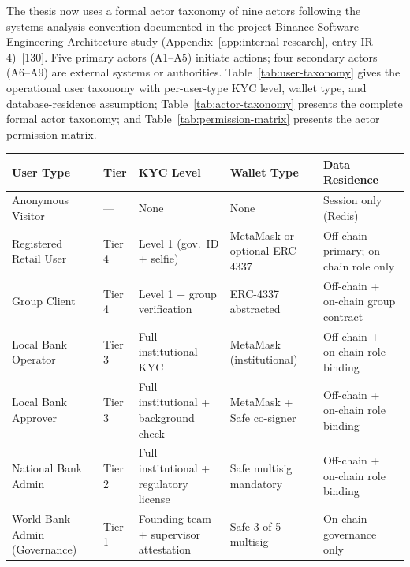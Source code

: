 \documentclass[12pt,a4paper]{report}
\newcommand{\tableheadcolor}{\rowcolor{TableHeadBg}}
\begin{document}
The thesis now uses a formal actor taxonomy of nine actors following the systems-analysis convention documented in the project Binance Software Engineering Architecture study (Appendix~\ref{app:internal-research}, entry IR-4)~[130]. Five primary actors (A1--A5) initiate actions; four secondary actors (A6--A9) are external systems or authorities. Table~\ref{tab:user-taxonomy} gives the operational user taxonomy with per-user-type KYC level, wallet type, and database-residence assumption; Table~\ref{tab:actor-taxonomy} presents the complete formal actor taxonomy; and Table~\ref{tab:permission-matrix} presents the actor permission matrix.

\begin{table}[H]
\centering
\begin{tabular}{p{3.1cm}p{1.4cm}p{2.6cm}p{2.4cm}p{3.4cm}}
\toprule
\tableheadcolor
\textbf{User Type} & \textbf{Tier} & \textbf{KYC Level} & \textbf{Wallet Type} & \textbf{Data Residence} \\
\midrule
Anonymous Visitor & --- & None & None & Session only (Redis) \\
Registered Retail User & Tier 4 & Level 1 (gov.\ ID + selfie) & MetaMask or optional ERC-4337 & Off-chain primary; on-chain role only \\
Group Client & Tier 4 & Level 1 + group verification & ERC-4337 abstracted & Off-chain + on-chain group contract \\
Local Bank Operator & Tier 3 & Full institutional KYC & MetaMask (institutional) & Off-chain + on-chain role binding \\
Local Bank Approver & Tier 3 & Full institutional + background check & MetaMask + Safe co-signer & Off-chain + on-chain role binding \\
National Bank Admin & Tier 2 & Full institutional + regulatory license & Safe multisig mandatory & Off-chain + on-chain role binding \\
World Bank Admin (Governance) & Tier 1 & Founding team + supervisor attestation & Safe 3-of-5 multisig & On-chain governance only \\
\bottomrule
\end{tabular}
\end{table}
\end{document}
